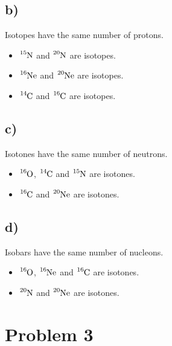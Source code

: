 \documentclass{article}
\begin{document}
\subsection*{b)}
Isotopes have the same number of protons. 
\begin{itemize}
  \item $\ce{_{}^{15}\text{N}_{}}$ and $\ce{_{}^{20}\text{N}_{}}$ are isotopes. 
  \item $\ce{_{}^{16}\text{Ne}_{}}$ and $\ce{_{}^{20}\text{Ne}_{}}$ are isotopes. 
  \item $\ce{_{}^{14}\text{C}_{}}$ and $\ce{_{}^{16}\text{C}_{}}$ are isotopes. 
\end{itemize}

\subsection*{c)}
Isotones have the same number of neutrons. 
\begin{itemize}
  \item $\ce{_{}^{16}\text{O}_{}}$, $\ce{_{}^{14}\text{C}_{}}$ and $\ce{_{}^{15}\text{N}_{}}$ are isotones. 
  \item $\ce{_{}^{16}\text{C}_{}}$ and $\ce{_{}^{20}\text{Ne}_{}}$ are isotones. 
\end{itemize}

\subsection*{d)}
Isobars have the same number of nucleons. 
\begin{itemize}
  \item $\ce{_{}^{16}\text{O}_{}}$, $\ce{_{}^{16}\text{Ne}_{}}$ and $\ce{_{}^{16}\text{C}_{}}$ are isotones. 
  \item $\ce{_{}^{20}\text{N}_{}}$ and $\ce{_{}^{20}\text{Ne}_{}}$ are isotones. 
\end{itemize}


\section*{Problem 3}
\end{document}
